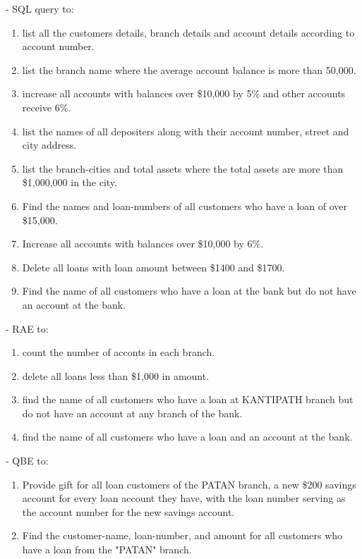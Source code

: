\documentclass[12pt]{article}
\begin{document}
\begin{enumerate}
        - SQL query to:
        \begin{enumerate}[noitemsep, topsep = 0pt, label = \alph*.]
            \item list all the customers details, branch details and account details according to account number.
            \item list the branch name where the average account balance is more than 50,000.
            \item increase all accounts with balances over \$10,000 by 5\% and other accounts receive 6\%.
            \item list the names of all depositers along with their account number, street and city address.
            \item list the branch-cities and total assets where the total assets are more than \$1,000,000 in the city.
            \item Find the names and loan-numbers of all customers who have a loan of over \$15,000.
            \item Increase all accounts with balances over \$10,000 by 6\%.
            \item Delete all loans with loan amount between \$1400 and \$1700.
            \item Find the name of all customers who have a loan at the bank but do not have an account at the bank.
        \end{enumerate}

        - RAE to:
        \begin{enumerate}[noitemsep, topsep = 0pt, label = \alph*.]
            \item count the number of acconts in each branch.
            \item delete all loans less than \$1,000 in amount.
            \item find the name of all customers who have a loan at KANTIPATH branch but do not have an account at any branch of the bank.
            \item find the name of all customers who have a loan and an account at the bank.
        \end{enumerate}

        - QBE to:
        \begin{enumerate}[noitemsep, topsep = 0pt, label = \alph*.]
            \item Provide gift for all loan customers of the PATAN branch, a new \$200 savings account for every loan account they have, with the loan number serving as the account number for the new savings account.
            \item Find the customer-name, loan-number, and amount for all customers who have a loan from the "PATAN" branch.
        \end{enumerate}


\end{enumerate}
\end{document}
